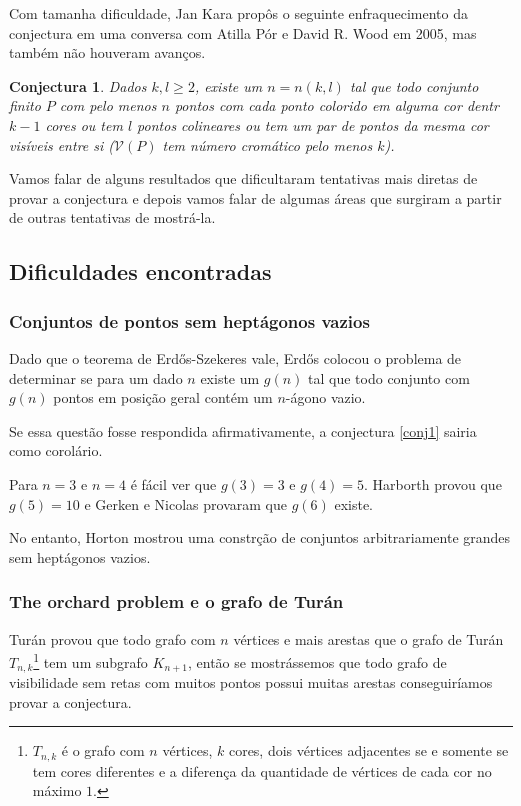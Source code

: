 \documentclass[a4paper]{book}
\newtheorem{conjectura}{Conjectura}
\begin{document}
Com tamanha dificuldade, Jan Kara propôs o seguinte enfraquecimento da conjectura em uma conversa com Atilla Pór e David R. Wood em 2005, mas também não houveram avanços.
\begin{conjectura}
    Dados $k,l\geq 2$, existe um $n=n(k,l)$ tal que todo conjunto finito $P$ com pelo menos $n$ pontos com cada ponto colorido em alguma cor dentr $k-1$ cores ou tem $l$ pontos colineares ou tem um par de pontos da mesma cor visíveis entre si ($\mathcal V(P)$ tem número cromático pelo menos $k$).
\end{conjectura}

Vamos falar de alguns resultados que dificultaram tentativas mais diretas de provar a conjectura e depois vamos falar de algumas áreas que surgiram a partir de outras tentativas de mostrá-la.
\subsection{Dificuldades encontradas}

\subsubsection{Conjuntos de pontos sem heptágonos vazios}
Dado que o teorema de Erd\H os-Szekeres vale, Erd\H os colocou o problema de determinar se para um dado $n$ existe um $g(n)$ tal que todo conjunto com $g(n)$ pontos em posição geral contém um $n$-ágono vazio.

Se essa questão fosse respondida afirmativamente, a conjectura \ref{conj1} sairia como corolário.

Para $n=3$ e $n=4$ é fácil ver que $g(3)=3$ e $g(4)=5$. Harborth\cite{Harborth1978} provou que $g(5)=10$ e Gerken\cite{Gerken} e Nicolas\cite{Nicolas} provaram que $g(6)$ existe.

No entanto, Horton\cite{heptagon} mostrou uma constrção de conjuntos arbitrariamente grandes sem heptágonos vazios.

\subsubsection{The orchard problem e o grafo de Turán}
Turán provou que todo grafo com $n$ vértices e mais arestas que o grafo de Turán $T_{n,k}$\footnote{$T_{n,k}$ é o grafo com $n$ vértices, $k$ cores, dois vértices adjacentes se e somente se tem cores diferentes e a diferença da quantidade de vértices de cada cor no máximo $1$.} tem um subgrafo $K_{n+1}$, então se mostrássemos que todo grafo de visibilidade sem retas com muitos pontos possui muitas arestas conseguiríamos provar a conjectura.
\end{document}
